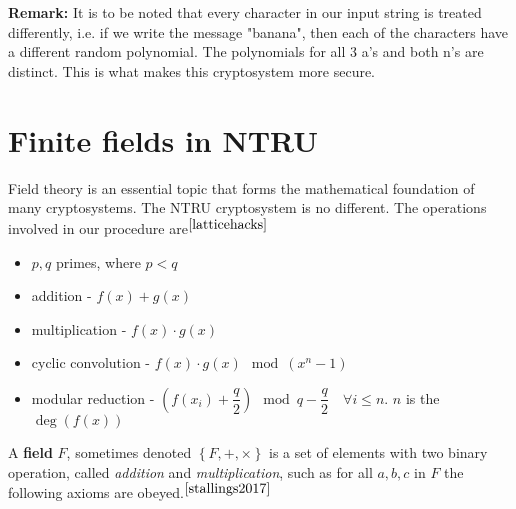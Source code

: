 \documentclass[a4paper,12pt]{article}
\begin{document}
\begin{flushleft}
\textbf{Remark:} It is to be noted that every character in our input string is treated differently, i.e. if we write the message "banana", then each of the characters have a different random polynomial. The polynomials for all 3 a's and both n's are distinct. This is what makes this cryptosystem more secure.
\end{flushleft}

\section{Finite fields in NTRU}
\begin{flushleft}
Field theory is an essential topic that forms the mathematical foundation of many cryptosystems. The NTRU cryptosystem is no different. The operations involved in our procedure are$^{\cite{latticehacks}}$

\begin{itemize}
	\item $p,q$ primes, where $p<q$
	\item addition - $f(x)+g(x)$
	\item multiplication - $f(x)\cdot g(x)$
	\item cyclic convolution - $f(x)\cdot g(x) \mod (x^n-1)$
	\item modular reduction - $\left(f(x_i)+\dfrac q2\right)\mod q - \dfrac q2 \quad \forall i\le n$. $n$ is the $\deg(f(x))$
\end{itemize}
\end{flushleft}

\begin{flushleft}
A \textbf{field} $F$, sometimes denoted $\left\{F,+,\times\right\}$ is a set of elements with two binary operation, called \textit{addition} and \textit{multiplication}, such as for all $a,b,c$ in $F$ the following axioms are obeyed.$^{\cite{stallings2017}}$
\end{flushleft}
\end{document}
